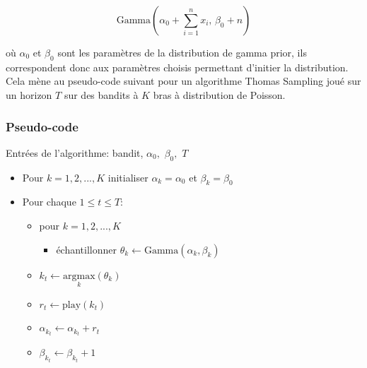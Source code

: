\documentclass[letterpaper,11pt]{article}
\begin{document}
\begin{equation}
\mathrm{Gamma}\left(\alpha_0 + \sum_{i=1}^n x_i,\,\beta_0 + n\right)
\end{equation}

où $\alpha_0$ et $\beta_0$ sont les paramètres de la distribution de gamma prior, ils correspondent donc aux paramètres choisis permettant d'initier la distribution.\\

Cela mène au pseudo-code suivant pour un algorithme Thomas Sampling joué sur un horizon $T$ sur des bandits à $K$ bras à distribution de Poisson.

\subsubsection{Pseudo-code}

Entrées de l'algorithme: bandit, $\alpha_0,$ $\beta_0,$ $T$\\

\begin{itemize}
\setlength\itemsep{0.2cm}

\item
Pour $k=1,2,...,K$ initialiser $\alpha_k=\alpha_0$ et $\beta_k=\beta_0$

\item Pour chaque $1\leq t \leq T :$

\begin{itemize}
\item
pour $k=1,2,...,K$

\begin{itemize}
\item
échantillonner $\theta_k \leftarrow \mathrm{Gamma}(\alpha_k,\beta_k)$

\end{itemize}

\item
$k_t\leftarrow \underset{k}{\mathrm{argmax}} (\theta_{k})$

\item
$r_t\leftarrow \mathrm{play}(k_t)$

\item 
$\alpha_{k_t} \leftarrow \alpha_{k_t}+r_t$

\item
$\beta_{k_t} \leftarrow \beta_{k_t}+1$

\end{itemize}

\end{itemize}
\end{document}
